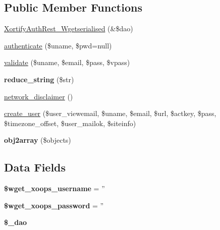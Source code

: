 \subsection*{Public Member Functions}
\begin{DoxyCompactItemize}
\item 
\hyperlink{class_xortify_auth_rest___wgetserialised_ae7a6ecbdc464f48cce1e8edfa7de02d8}{Xortify\-Auth\-Rest\-\_\-\-Wgetserialised} (\&\$dao)
\item 
\hyperlink{class_xortify_auth_rest___wgetserialised_a00678ba307326b734e6c679f28bea315}{authenticate} (\$uname, \$pwd=null)
\item 
\hyperlink{class_xortify_auth_rest___wgetserialised_a91121a1b702dfd20fb65a027c8ed26ec}{validate} (\$uname, \$email, \$pass, \$vpass)
\item 
\hypertarget{class_xortify_auth_rest___wgetserialised_ae463a3baa44e95fa5b5151ab2334df1c}{{\bfseries reduce\-\_\-string} (\$str)}\label{class_xortify_auth_rest___wgetserialised_ae463a3baa44e95fa5b5151ab2334df1c}

\item 
\hyperlink{class_xortify_auth_rest___wgetserialised_a1874c27b6f81a3f2ff9015405ad0f8bc}{network\-\_\-disclaimer} ()
\item 
\hyperlink{class_xortify_auth_rest___wgetserialised_ac72efc5ad313a592cf6706876f56f7ec}{create\-\_\-user} (\$user\-\_\-viewemail, \$uname, \$email, \$url, \$actkey, \$pass, \$timezone\-\_\-offset, \$user\-\_\-mailok, \$siteinfo)
\item 
\hypertarget{class_xortify_auth_rest___wgetserialised_aabc52e4f78557f0e0b360a8aaba6e11d}{{\bfseries obj2array} (\$objects)}\label{class_xortify_auth_rest___wgetserialised_aabc52e4f78557f0e0b360a8aaba6e11d}

\end{DoxyCompactItemize}
\subsection*{Data Fields}
\begin{DoxyCompactItemize}
\item 
\hypertarget{class_xortify_auth_rest___wgetserialised_a237f5dcc3c161c5b1909327a90b56618}{{\bfseries \$wget\-\_\-xoops\-\_\-username} = ''}\label{class_xortify_auth_rest___wgetserialised_a237f5dcc3c161c5b1909327a90b56618}

\item 
\hypertarget{class_xortify_auth_rest___wgetserialised_ab9145a618042e8282ecb90d5f634311f}{{\bfseries \$wget\-\_\-xoops\-\_\-password} = ''}\label{class_xortify_auth_rest___wgetserialised_ab9145a618042e8282ecb90d5f634311f}

\item 
\hypertarget{class_xortify_auth_rest___wgetserialised_a12a029c610f699b4b25e79a1f64a3485}{{\bfseries \$\-\_\-dao}}\label{class_xortify_auth_rest___wgetserialised_a12a029c610f699b4b25e79a1f64a3485}

\end{DoxyCompactItemize}



